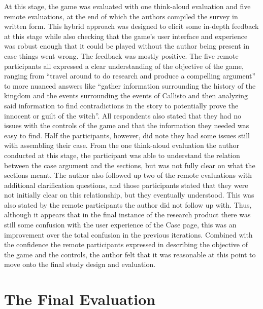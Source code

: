 \documentclass{l4proj}
\begin{document}
At this stage, the game was evaluated with one think-aloud evaluation and five remote evaluations, at the end of which the authors compiled the \citet{fullerton2004game} survey in written form. This hybrid approach was designed to elicit some in-depth feedback at this stage while also checking that the game’s user interface and experience was robust enough that it could be played without the author being present in case things went wrong. The feedback was mostly positive. The five remote participants all expressed a clear understanding of the objective of the game, ranging from “travel around to do research and produce a compelling argument” to more nuanced answers like “gather information surrounding the history of the kingdom and the events surrounding the events of Callisto and then analyzing said information to find contradictions in the story to potentially prove the innocent or guilt of the witch”. All respondents also stated that they had no issues with the controls of the game and that the information they needed was easy to find. Half the participants, however, did note they had some issues still with assembling their case. From the one think-aloud evaluation the author conducted at this stage, the participant was able to understand the relation between the case argument and the sections, but was not fully clear on what the sections meant. The author also followed up two of the remote evaluations with additional clarification questions, and those participants stated that they were not initially clear on this relationship, but they eventually understood. This was also stated by the remote participants the author did not follow up with. Thus, although it appears that in the final instance of the research product there was still some confusion with the user experience of the Case page, this was an improvement over the total confusion in the previous iterations. Combined with the confidence the remote participants expressed in describing the objective of the game and the controls, the author felt that it was reasonable at this point to move onto the final study design and evaluation. 

\chapter{The Final Evaluation}
\end{document}
